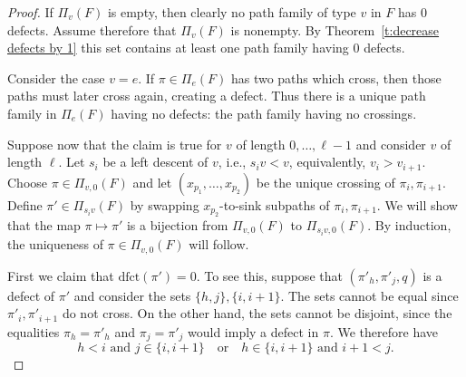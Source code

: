 \documentclass[12pt]{amsart}
\theoremstyle{definition}
\numberwithin{equation}{section}
\newcommand{\dfct}{\mathrm{dfct}}
\newcommand{\ctr}[1]{{x}_{#1}}
\begin{document}


\begin{proof}
If $\Pi_v(F)$ is empty, then clearly no path family of type $v$ in $F$ has $0$ defects.  Assume therefore that $\Pi_v(F)$ is nonempty.  By Theorem~\ref{t:decrease defects by 1} this set contains at least one path family having $0$ defects.

Consider the case $v=e$.  If $\pi \in \Pi_e(F)$ has two paths which cross, then those paths must later cross again, creating a defect.  Thus there is a unique path family in $\Pi_e(F)$ having no defects: the path family having no crossings.  

Suppose now that the claim is true for 
$v$ of length $0,\dotsc, \ell-1$ and consider $v$ of length $\ell$.
Let $s_i$ be a left descent of $v$, i.e.,
$s_iv < v$, equivalently, $v_i > v_{i+1}$. 
Choose
$\pi \in \Pi_{v, 0}(F)$ 
and let $(\ctr{p_1}, \dots, \ctr{p_2})$ be the unique crossing of 
$\pi_i, \pi_{i+1}$. 
Define $\pi' \in \Pi_{s_iv}(F)$ 
by swapping $\ctr{p_2}$-to-sink subpaths of $\pi_i, \pi_{i+1}$.  
We will show that the map $\pi \mapsto \pi'$ is a bijection from $\Pi_{v, 0}(F)$ to $\Pi_{s_iv, 0}(F)$. By induction, the uniqueness of $\pi \in \Pi_{v, 0}(F)$ will follow.

    First we claim that $\dfct(\pi') = 0$. To see this, suppose  that $(\pi'_h, \pi'_j, q)$ is a defect of $\pi'$ and consider the sets $\{h, j\}, \{i, i+1\}$.
    The sets cannot be equal since $\pi'_i, \pi'_{i+1}$ do not cross. 
    On the other hand, the sets cannot be disjoint, since the equalities $\pi_h = \pi'_h$ and $\pi_j = \pi'_j$ would imply a defect in $\pi$. We therefore have
    \begin{equation}\label{eq: hiji+1}
        h < i \text{ and } j \in \{i, i+1\} \quad \text{or} \quad h \in \{i, i+1\} \text{ and } i+1 < j.
    \end{equation}
    

\end{proof}
\end{document}
